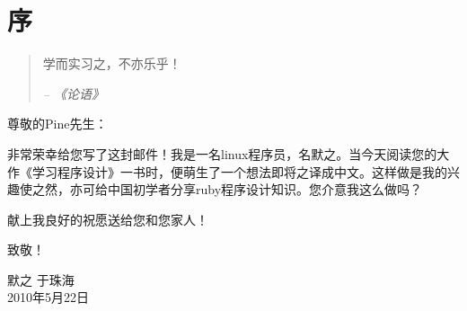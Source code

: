 \chapter*{序}
\begin{quotation}
学而实习之，不亦乐乎！
\begin{flushright}
\textit{ -- 《论语》}
\end{flushright}
\end{quotation}

\begin{center}
\end{center}

\noindent
尊敬的Pine先生：

   非常荣幸给您写了这封邮件！我是一名linux程序员，名默之。当今天阅读您的大作《学习程序设计》一书时，便萌生了一个想法\pozhehao 即将之译成中文。这样做是我的兴趣使之然，亦可给中国初学者分享ruby程序设计知识。您介意我这么做吗？
    
    献上我良好的祝愿送给您和您家人！

\begin{flushleft}
致敬！\\
\end{flushleft}

\begin{flushright}
默之 于珠海\\
2010年5月22日
\end{flushright}
